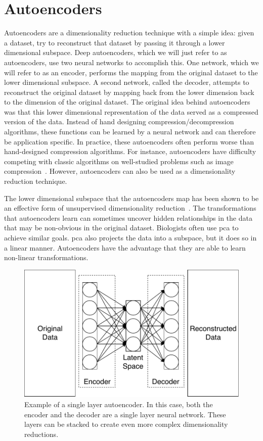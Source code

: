 \section{Autoencoders}
Autoencoders are a dimensionality reduction technique with a simple idea: given a dataset, try to reconstruct that dataset by passing it through a lower dimensional subspace.
Deep autoencoders, which we will just refer to as autoencoders, use two neural networks to accomplish this.
One network, which we will refer to as an encoder, performs the mapping from the original dataset to the lower dimensional subspace.
A second network, called the decoder, attempts to reconstruct the original dataset by mapping back from the lower dimension back to the dimension of the original dataset.
The original idea behind autoencoders was that this lower dimensional representation of the data served as a compressed version of the data.
Instead of hand designing compression/decompression algorithms, these functions can be learned by a neural network and can therefore be application specific.
In practice, these autoencoders often perform worse than hand-designed compression algorithms.
For instance, autoencoders have difficulty competing with classic algorithms on well-studied problems such as image compression~\cite{theis2017lossy}.
However, autoencoders can also be used as a dimensionality reduction technique.

The lower dimensional subspace that the autoencoders map has been shown to be an effective form of unsupervised dimensionality reduction~\cite{baldi2012autoencoders}.
The transformations that autoencoders learn can sometimes uncover hidden relationships in the data that may be non-obvious in the original dataset.
Biologists often use \gls{pca} to achieve similar goals.
\gls{pca} also projects the data into a subspace, but it does so in a linear manner.
Autoencoders have the advantage that they are able to learn non-linear transformations.

\begin{figure}[t!]
\begin{center}
\includegraphics{figs/Autoencoder.pdf}
\caption[Example of a single layer autoencoder]{Example of a single layer autoencoder.
In this case, both the encoder and the decoder are a single layer neural network.
These layers can be stacked to create even more complex dimensionality reductions.}
\end{center}
\label{fig:ae}
\end{figure}

